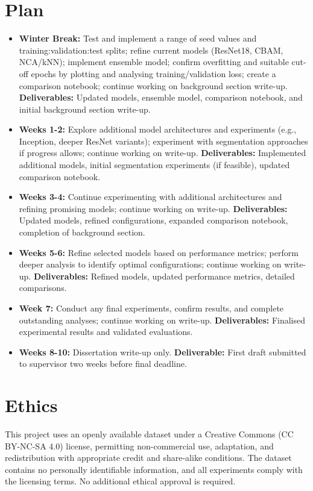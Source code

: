 \documentclass[11pt]{article}
\begin{document}
\section*{Plan}\label{plan}
\begin{itemize}
    \tightlist
    \item 
      \textbf{Winter Break:} Test and implement a range of seed values and training:validation:test splits; refine current models (ResNet18, CBAM, NCA/kNN); implement ensemble model; confirm overfitting and suitable cut-off epochs by plotting and analysing training/validation loss; create a comparison notebook; continue working on background section write-up. \textbf{Deliverables:} Updated models, ensemble model, comparison notebook, and initial background section write-up.
    \item
      \textbf{Weeks 1-2:} Explore additional model architectures and experiments (e.g., Inception, deeper ResNet variants); experiment with segmentation approaches if progress allows; continue working on write-up. \textbf{Deliverables:} Implemented additional models, initial segmentation experiments (if feasible), updated comparison notebook.
    \item
      \textbf{Weeks 3-4:} Continue experimenting with additional architectures and refining promising models; continue working on write-up. \textbf{Deliverables:} Updated models, refined configurations, expanded comparison notebook, completion of background section.
    \item
      \textbf{Weeks 5-6:} Refine selected models based on performance metrics; perform deeper analysis to identify optimal configurations; continue working on write-up. \textbf{Deliverables:} Refined models, updated performance metrics, detailed comparisons.
    \item 
      \textbf{Week 7:} Conduct any final experiments, confirm results, and complete outstanding analyses; continue working on write-up. \textbf{Deliverables:} Finalised experimental results and validated evaluations.
    \item
      \textbf{Weeks 8-10:} Dissertation write-up only. \textbf{Deliverable:} First draft submitted to supervisor two weeks before final deadline.
\end{itemize}



\section*{Ethics}
This project uses an openly available dataset under a Creative Commons (CC BY-NC-SA 4.0) license, 
permitting non-commercial use, adaptation, and redistribution with appropriate credit and 
share-alike conditions. The dataset contains no personally identifiable information, and all 
experiments comply with the licensing terms. No additional ethical approval is required.
\end{document}
